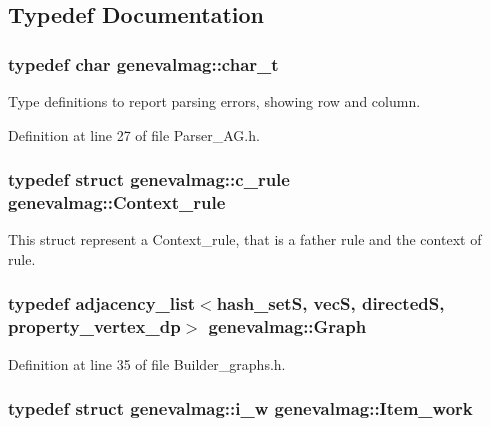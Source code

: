 \subsection{Typedef Documentation}
\hypertarget{namespacegenevalmag_63d49b2e7b123ae54a8fdc03bcbde116}{
\subsubsection[{char\_\-t}]{\setlength{\rightskip}{0pt plus 5cm}typedef char {\bf genevalmag::char\_\-t}}}
\label{namespacegenevalmag_63d49b2e7b123ae54a8fdc03bcbde116}


Type definitions to report parsing errors, showing row and column. 

Definition at line 27 of file Parser\_\-AG.h.\hypertarget{namespacegenevalmag_59ad19d59075a158ceb18d55009ce9a7}{
\subsubsection[{Context\_\-rule}]{\setlength{\rightskip}{0pt plus 5cm}typedef struct {\bf genevalmag::c\_\-rule}  {\bf genevalmag::Context\_\-rule}}}
\label{namespacegenevalmag_59ad19d59075a158ceb18d55009ce9a7}


This struct represent a Context\_\-rule, that is a father rule and the context of rule. \hypertarget{namespacegenevalmag_4a96de9ebfc7d48233406ab9cad55cb5}{
\subsubsection[{Graph}]{\setlength{\rightskip}{0pt plus 5cm}typedef adjacency\_\-list$<$hash\_\-setS, vecS, directedS, property\_\-vertex\_\-dp$>$ {\bf genevalmag::Graph}}}
\label{namespacegenevalmag_4a96de9ebfc7d48233406ab9cad55cb5}




Definition at line 35 of file Builder\_\-graphs.h.\hypertarget{namespacegenevalmag_bb601d42781f0764762a8e5a8ded19c6}{
\subsubsection[{Item\_\-work}]{\setlength{\rightskip}{0pt plus 5cm}typedef struct {\bf genevalmag::i\_\-w}  {\bf genevalmag::Item\_\-work}}}
\label{namespacegenevalmag_bb601d42781f0764762a8e5a8ded19c6}


